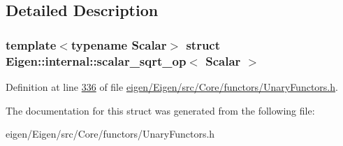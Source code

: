 \subsection{Detailed Description}
\subsubsection*{template$<$typename Scalar$>$\newline
struct Eigen\+::internal\+::scalar\+\_\+sqrt\+\_\+op$<$ Scalar $>$}



Definition at line \hyperlink{eigen_2_eigen_2src_2_core_2functors_2_unary_functors_8h_source_l00336}{336} of file \hyperlink{eigen_2_eigen_2src_2_core_2functors_2_unary_functors_8h_source}{eigen/\+Eigen/src/\+Core/functors/\+Unary\+Functors.\+h}.



The documentation for this struct was generated from the following file\+:\begin{DoxyCompactItemize}
\item 
eigen/\+Eigen/src/\+Core/functors/\+Unary\+Functors.\+h\end{DoxyCompactItemize}
